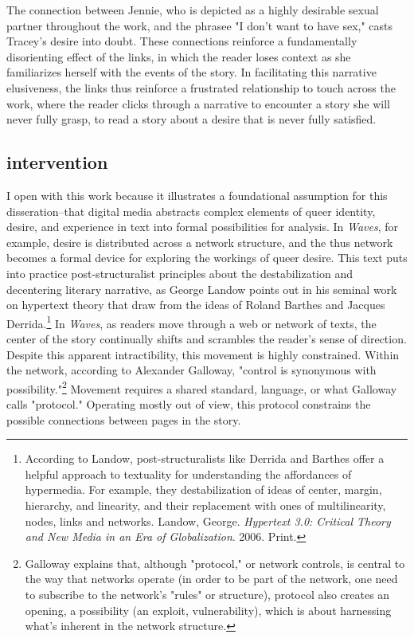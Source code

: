 \documentclass[11pt]{article}
\begin{document}
The connection between Jennie, who is depicted as a highly desirable
sexual partner throughout the work, and the phrasee "I don't want to
have sex," casts Tracey's desire into doubt. These connections
reinforce a fundamentally disorienting effect of the links, in which
the reader loses context as she familiarizes herself with the events
of the story. In facilitating this narrative elusiveness, the links
thus reinforce a frustrated relationship to touch across the work,
where the reader clicks through a narrative to encounter a story she
will never fully grasp, to read a story about a desire that is never
fully satisfied. 

\subsection{intervention}
\label{sec:org7d525f8}
I open with this work because it illustrates a foundational assumption
for this disseration--that digital media abstracts complex elements of
queer identity, desire, and experience in text into formal
possibilities for analysis. In \emph{Waves}, for example, desire is
distributed across a network structure, and the thus network becomes a
formal device for exploring the workings of queer desire. This text
puts into practice post-structuralist principles about the
destabilization and decentering literary narrative, as George Landow
points out in his seminal work on hypertext theory that draw from the
ideas of Roland Barthes and Jacques Derrida.\footnote{According to Landow, post-structuralists like Derrida and
Barthes offer a helpful approach to textuality for understanding the
affordances of hypermedia. For example, they destabilization of ideas
of center, margin, hierarchy, and linearity, and their replacement
with ones of multilinearity, nodes, links and networks. Landow,
George. \emph{Hypertext 3.0: Critical Theory and New Media in an Era of
Globalization}. 2006. Print.} In \emph{Waves}, as
readers move through a web or network of texts, the center of the
story continually shifts and scrambles the reader's sense of
direction. Despite this apparent intractibility, this movement is
highly constrained. Within the network, according to Alexander
Galloway, "control is synonymous with possibility."\footnote{Galloway explains that, although "protocol," or network
controls, is central to the way that networks operate (in order to be
part of the network, one need to subscribe to the network’s "rules" or
structure), protocol also creates an opening, a possibility (an
exploit, vulnerability), which is about harnessing what’s inherent in
the network structure.} Movement
requires a shared standard, language, or what Galloway calls
"protocol." Operating mostly out of view, this protocol constrains the
possible connections between pages in the story.
\end{document}
